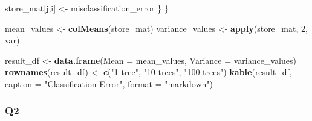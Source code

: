 \documentclass[
]{article}
\newenvironment{Shaded}{\begin{snugshade}}{\end{snugshade}}
\newcommand{\AttributeTok}[1]{\textcolor[rgb]{0.13,0.29,0.53}{#1}}
\newcommand{\DecValTok}[1]{\textcolor[rgb]{0.00,0.00,0.81}{#1}}
\newcommand{\FunctionTok}[1]{\textcolor[rgb]{0.13,0.29,0.53}{\textbf{#1}}}
\newcommand{\NormalTok}[1]{#1}
\newcommand{\OtherTok}[1]{\textcolor[rgb]{0.56,0.35,0.01}{#1}}
\newcommand{\StringTok}[1]{\textcolor[rgb]{0.31,0.60,0.02}{#1}}
\begin{document}
\begin{Shaded}
\begin{Highlighting}[]
\NormalTok{    store\_mat[j,i] }\OtherTok{\textless{}{-}}\NormalTok{ misclassification\_error}
\NormalTok{  \}}
\NormalTok{\}}

\NormalTok{mean\_values }\OtherTok{\textless{}{-}} \FunctionTok{colMeans}\NormalTok{(store\_mat)}
\NormalTok{variance\_values }\OtherTok{\textless{}{-}} \FunctionTok{apply}\NormalTok{(store\_mat, }\DecValTok{2}\NormalTok{, var)}

\NormalTok{result\_df }\OtherTok{\textless{}{-}} \FunctionTok{data.frame}\NormalTok{(}\AttributeTok{Mean =}\NormalTok{ mean\_values, }\AttributeTok{Variance =}\NormalTok{ variance\_values)}
\FunctionTok{rownames}\NormalTok{(result\_df) }\OtherTok{\textless{}{-}} \FunctionTok{c}\NormalTok{(}\StringTok{"1 tree"}\NormalTok{, }\StringTok{"10 trees"}\NormalTok{, }\StringTok{"100 trees"}\NormalTok{)}
\FunctionTok{kable}\NormalTok{(result\_df, }\AttributeTok{caption =} \StringTok{"Classification Error"}\NormalTok{, }\AttributeTok{format =} \StringTok{"markdown"}\NormalTok{)}
\end{Highlighting}
\end{Shaded}

\hypertarget{q2-1}{%
\subsubsection{Q2}\label{q2-1}}
\end{document}
